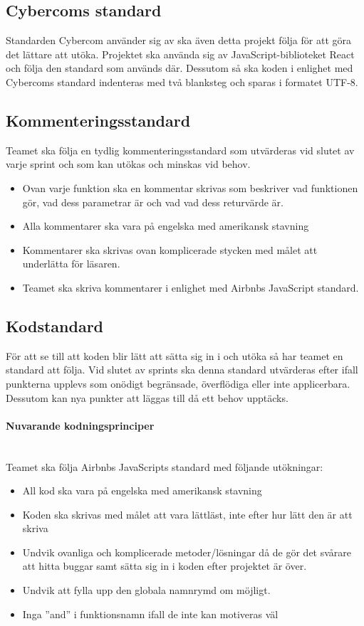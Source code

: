 \documentclass[10pt]{article}
\begin{document}
	\subsection{Cybercoms standard}
	Standarden Cybercom använder sig av ska även detta projekt följa för att göra det lättare att utöka. Projektet ska använda sig av JavaScript-biblioteket React och följa den standard som används där. Dessutom så ska koden i enlighet med Cybercoms standard indenteras med två blanksteg och sparas i formatet UTF-8.
	
	
	\subsection{Kommenteringsstandard}
	Teamet ska följa en tydlig kommenteringsstandard som utvärderas vid slutet av varje sprint och som kan utökas och minskas vid behov.
	
	\begin{itemize}
		\item 	Ovan varje funktion ska en kommentar skrivas som beskriver vad funktionen gör, vad dess parametrar är och vad vad dess returvärde är.
		\item Alla kommentarer ska vara på engelska med amerikansk stavning
		\item Kommentarer ska skrivas ovan komplicerade stycken med målet att underlätta för läsaren.
		\item Teamet ska skriva kommentarer i enlighet med Airbnbs JavaScript standard.
	\end{itemize}

	
	\subsection{Kodstandard}
	För att se till att koden blir lätt att sätta sig in i och utöka så har teamet en standard att följa. Vid slutet av sprints ska denna standard utvärderas efter ifall punkterna upplevs som onödigt begränsade, överflödiga eller inte applicerbara. Dessutom kan nya punkter att läggas till då ett behov upptäcks.

	\paragraph{Nuvarande kodningsprinciper} \mbox{}
	\\
	Teamet ska följa Airbnbs JavaScripts standard med följande utökningar:
	\begin{itemize}
	\item All kod ska vara på engelska med amerikansk stavning
	\item Koden ska skrivas med målet att vara lättläst, inte efter hur lätt den är att skriva
	\item Undvik ovanliga och komplicerade metoder/lösningar då de gör det svårare att hitta buggar samt sätta sig in i koden efter projektet är över.
	\item Undvik att fylla upp den globala namnrymd om möjligt.
	\item Inga  ''and'' i funktionsnamn ifall de inte kan motiveras väl
	
	\end{itemize}
	
\end{document}
